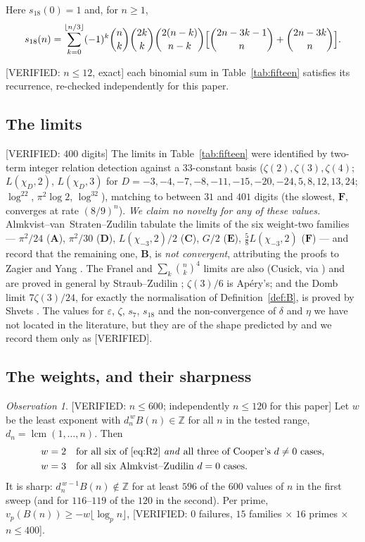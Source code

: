 \documentclass[11pt,reqno]{amsart}
\theoremstyle{plain}
\theoremstyle{definition}
\theoremstyle{remark}
\newtheorem{observation}[theorem]{Observation}
\newcommand{\Z}{\mathbb{Z}}
\newcommand{\vp}{v_p}
\newcommand{\bin}[2]{\binom{#1}{#2}}
\DeclareMathOperator{\lcm}{lcm}
\newcommand{\Verified}{\textup{\textsf{[VERIFIED]}}}
\newcommand{\VerifiedR}[1]{\textup{\textsf{[VERIFIED: #1]}}}
\numberwithin{equation}{section}
\begin{document}
Here $s_{18}(0)=1$ and, for $n\ge1$,
\begin{equation}\label{eq:s18}
  s_{18}(n)=\sum_{k=0}^{\lfloor n/3\rfloor}(-1)^k\bin nk\bin{2k}k\bin{2(n-k)}{n-k}
     \Bigl[\bin{2n-3k-1}n+\bin{2n-3k}n\Bigr].
\end{equation}

\VerifiedR{$n\le12$, exact} each binomial sum in Table~\ref{tab:fifteen} satisfies its
recurrence, re-checked independently for this paper.

\subsection{The limits}
\VerifiedR{$400$ digits} The limits in Table~\ref{tab:fifteen} were identified by two-term
integer relation detection against a $33$-constant basis
($\zeta(2),\zeta(3),\zeta(4)$; $L(\chi_D,2)$, $L(\chi_D,3)$ for
$D=-3,-4,-7,-8,-11,-15,-20,-24,5,8,12,13,24$; $\log^22$, $\pi^2\log2$, $\log^32$), matching
to between $31$ and $401$ digits (the slowest, $\mathbf F$, converges at rate $(8/9)^n$).
\emph{We claim no novelty for any of these values.} Almkvist--van~Straten--Zudilin
\cite[\S2]{ASvSZ} tabulate the limits of the six weight-two families --- $\pi^2/24$
($\mathbf A$), $\pi^2/30$ ($\mathbf D$), $L(\chi_{-3},2)/2$ ($\mathbf C$), $G/2$
($\mathbf E$), $\tfrac58L(\chi_{-3},2)$ ($\mathbf F$) --- and record that the remaining
one, $\mathbf B$, is \emph{not convergent}, attributing the proofs to Zagier
\cite{Zagier2009} and Yang \cite{Yang2008}. The Franel and $\sum_k\bin nk^4$ limits are
also \cite[eq.~(20)]{ChamStraub} (Cusick, via \cite[p.~202]{vdPoorten1979}) and are proved
in general by Straub--Zudilin \cite{StraubZudilin}; $\zeta(3)/6$ is Ap\'ery's; and the Domb
limit $7\zeta(3)/24$, for exactly the normalisation of Definition~\ref{def:B}, is proved by
Shvets \cite{Shvets2026}. The values for $\varepsilon$, $\zeta$, $s_7$, $s_{18}$ and the
non-convergence of $\delta$ and $\eta$ we have not located in the literature, but they are
of the shape predicted by \cite{Zagier2009,AlmkvistZudilin2006} and we record them only as
\Verified.

\subsection{The weights, and their sharpness}
\begin{observation}\label{obs:weight}
\VerifiedR{$n\le600$; independently $n\le120$ for this paper}
Let $w$ be the least exponent with $d_n^{\,w}B(n)\in\Z$ for all $n$ in the tested range,
$d_n=\lcm(1,\dots,n)$. Then
\begin{align*}
  w&=2 &&\text{for all six of \eqref{eq:R2} \emph{and} all three of Cooper's $d\ne0$
     cases},\\
  w&=3 &&\text{for all six Almkvist--Zudilin $d=0$ cases}.
\end{align*}
It is sharp: $d_n^{\,w-1}B(n)\notin\Z$ for at least $596$ of the $600$ values of $n$ in the
first sweep (and for $116$--$119$ of the $120$ in the second). Per prime,
$\vp(B(n))\ge-w\lfloor\log_pn\rfloor$, \VerifiedR{$0$ failures, $15$ families $\times$
$16$ primes $\times$ $n\le400$}.
\end{observation}
\end{document}
